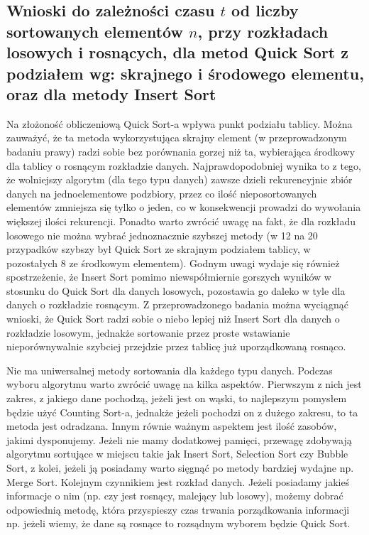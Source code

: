 \documentclass[polish,polish,a4paper]{article}
\begin{document}
\begin{spacing}{1.5}
\subsection{Wnioski do zależności czasu $t$ od liczby sortowanych elementów $n$, przy rozkładach losowych i rosnących, dla metod Quick Sort z podziałem wg: skrajnego i środowego elementu, oraz dla metody Insert Sort}

Na złożoność obliczeniową Quick Sort-a wpływa punkt podziału tablicy. Można zauważyć, że ta metoda wykorzystująca skrajny element (w przeprowadzonym badaniu prawy) radzi sobie bez porównania gorzej niż ta, wybierająca środkowy dla tablicy o rosnącym rozkładzie danych. Najprawdopodobniej wynika to z tego, że wolniejszy algorytm (dla tego typu danych) zawsze dzieli rekurencyjnie zbiór danych na jednoelementowe podzbiory, przez co ilość nieposortowanych elementów zmniejsza się tylko o jeden, co w konsekwencji prowadzi do wywołania większej ilości rekurencji. Ponadto warto zwrócić uwagę na fakt, że dla rozkładu losowego nie można wybrać jednoznacznie szybszej metody (w 12 na 20 przypadków szybszy był Quick Sort ze skrajnym podziałem tablicy, w pozostałych 8 ze środkowym elementem). Godnym uwagi wydaje się również spostrzeżenie, że Insert Sort pomimo niewspółmiernie gorszych wyników w stosunku do Quick Sort dla danych losowych, pozostawia go daleko w tyle dla danych o rozkładzie rosnącym. Z przeprowadzonego badania można wyciągnąć wnioski, że Quick Sort radzi sobie o niebo lepiej niż Insert Sort dla danych o rozkładzie losowym, jednakże sortowanie przez proste wstawianie nieporównywalnie szybciej przejdzie przez tablicę już uporządkowaną rosnąco.

Nie ma uniwersalnej metody sortowania dla każdego typu danych. Podczas wyboru algorytmu warto zwrócić uwagę na kilka aspektów. Pierwszym z nich jest zakres, z jakiego dane pochodzą, jeżeli jest on wąski, to najlepszym pomysłem będzie użyć Counting Sort-a, jednakże jeżeli pochodzi on z dużego zakresu, to ta metoda jest odradzana. Innym równie ważnym aspektem jest ilość zasobów, jakimi dysponujemy. Jeżeli nie mamy dodatkowej pamięci, przewagę zdobywają algorytmu sortujące w miejscu takie jak Insert Sort, Selection Sort czy Bubble Sort, z kolei, jeżeli ją posiadamy warto sięgnąć po metody bardziej wydajne np. Merge Sort. Kolejnym czynnikiem jest rozkład danych. Jeżeli posiadamy jakieś informacje o nim (np. czy jest rosnący, malejący lub losowy), możemy dobrać odpowiednią metodę, która przyspieszy czas trwania porządkowania informacji np. jeżeli wiemy, że dane są rosnące to rozsądnym wyborem będzie Quick Sort.


\end{spacing}
\end{document}
